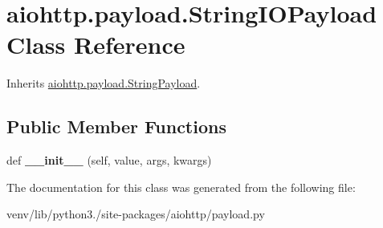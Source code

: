 \hypertarget{classaiohttp_1_1payload_1_1_string_i_o_payload}{}\section{aiohttp.\+payload.\+String\+I\+O\+Payload Class Reference}
\label{classaiohttp_1_1payload_1_1_string_i_o_payload}


Inherits \hyperlink{classaiohttp_1_1payload_1_1_string_payload}{aiohttp.\+payload.\+String\+Payload}.

\subsection*{Public Member Functions}
\begin{DoxyCompactItemize}
\item 
\mbox{\label{classaiohttp_1_1payload_1_1_string_i_o_payload_a8df6a2192648a153ee3662051e8bd059}} 
def {\bfseries \+\_\+\+\_\+init\+\_\+\+\_\+} (self, value, args, kwargs)
\end{DoxyCompactItemize}


The documentation for this class was generated from the following file\+:\begin{DoxyCompactItemize}
\item 
venv/lib/python3./site-\/packages/aiohttp/payload.\+py\end{DoxyCompactItemize}
